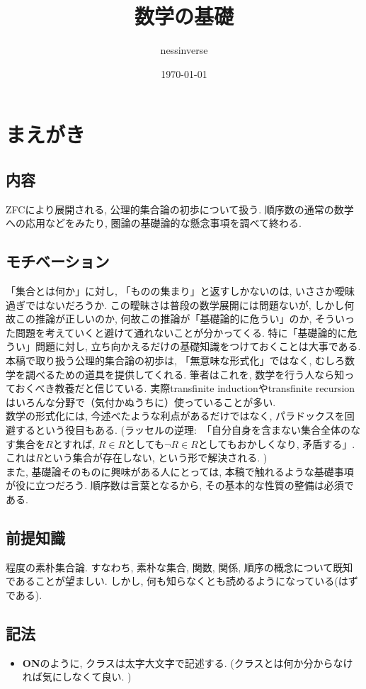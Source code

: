 \documentclass[a4paper]{bxjsarticle}
\title{数学の基礎}
\author{nessinverse}
\date{\today}
\theoremstyle{definition}
\begin{document}
    \maketitle
    \newpage
    \section*{まえがき}
    \subsection*{内容}
        ZFCにより展開される, 公理的集合論の初歩について扱う. 順序数の通常の数学への応用などをみたり, 圏論の基礎論的な懸念事項を調べて終わる.
    \subsection*{モチベーション}
    「集合とは何か」に対し, 「ものの集まり」と返すしかないのは, いささか曖昧過ぎではないだろうか. この曖昧さは普段の数学展開には問題ないが, しかし何故この推論が正しいのか, 何故この推論が「基礎論的に危うい」のか, そういった問題を考えていくと避けて通れないことが分かってくる. 特に「基礎論的に危うい」問題に対し, 立ち向かえるだけの基礎知識をつけておくことは大事である.\\
    本稿で取り扱う公理的集合論の初歩は, 「無意味な形式化」ではなく, むしろ数学を調べるための道具を提供してくれる. 筆者はこれを, 数学を行う人なら知っておくべき教養だと信じている. 実際transfinite inductionやtransfinite recursionはいろんな分野で（気付かぬうちに）使っていることが多い.\\
    数学の形式化には,  今述べたような利点があるだけではなく, パラドックスを回避するという役目もある. (ラッセルの逆理$\colon$  「自分自身を含まない集合全体のなす集合を$R$とすれば, $R \in R$としても$\lnot R \in R$としてもおかしくなり, 矛盾する」. これは$R$という集合が存在しない, という形で解決される. ) \\
    また, 基礎論そのものに興味がある人にとっては, 本稿で触れるような基礎事項が役に立つだろう. 順序数は言葉となるから, その基本的な性質の整備は必須である.
    
    \subsection*{前提知識}
        \cite{matsuzaka}程度の素朴集合論. すなわち, 素朴な集合, 関数, 関係, 順序の概念について既知であることが望ましい. しかし, 何も知らなくとも読めるようになっている(はずである).
    \subsection*{記法}
    \begin{itemize}
        \item \textbf{ON}のように, クラスは太字大文字で記述する.  (クラスとは何か分からなければ気にしなくて良い. )
    \end{itemize}
    \newpage
    \tableofcontents
    \newpage    
\end{document}
